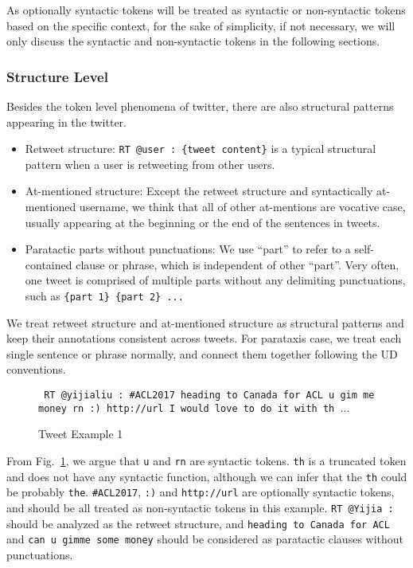 \documentclass[11pt,letterpaper]{article}
\begin{document}
As optionally syntactic tokens will be treated as syntactic or non-syntactic tokens based on the specific context, for the sake of simplicity, if not necessary, we will only discuss the syntactic and non-syntactic tokens in the following sections.

	
\subsubsection{Structure Level}
Besides the token level phenomena of twitter, there are also structural patterns appearing in the twitter.

\begin{itemize}
\item Retweet structure: {\tt RT @user : \{tweet content\}} is a typical structural pattern when a user is retweeting from other users. 
\item At-mentioned structure: Except the retweet structure and syntactically at-mentioned username, we think that all of other at-mentions are vocative case, usually appearing at the beginning or the end of the sentences in tweets.
\item Paratactic parts without punctuations: We use ``part'' to refer to a self-contained clause or phrase, which is independent of other ``part''. Very often, one tweet is comprised of multiple parts without any delimiting punctuations, such as {\tt \{part 1\} \{part 2\} ...}
\end{itemize}

We treat retweet structure and at-mentioned structure as structural patterns and keep their annotations consistent across tweets. For parataxis case, we treat each single sentence or phrase normally, and connect them together following the UD conventions. 

\begin{figure}[h]
\small
{\tt
RT @yijialiu : \#ACL2017 heading to Canada for ACL u gim me money rn :) http://url I would love to do it with th $\ldots$ %
}
\caption{Tweet Example 1}
\label{ex1}
\end{figure}

From Fig.~\ref{ex1}, we argue that {\tt u} and {\tt rn} are syntactic tokens.
{\tt th} is a truncated token and does not have any syntactic function, although we can infer that the {\tt th} could be probably {\tt the}.
{\tt \#ACL2017}, {\tt :)} and {\tt http://url} are optionally syntactic tokens, and should be all treated as non-syntactic tokens in this example.
{\tt RT @Yijia :} should be analyzed as the retweet structure, and {\tt heading to Canada for ACL} and {\tt can u gimme some money} should be considered as paratactic clauses without punctuations.
\end{document}
